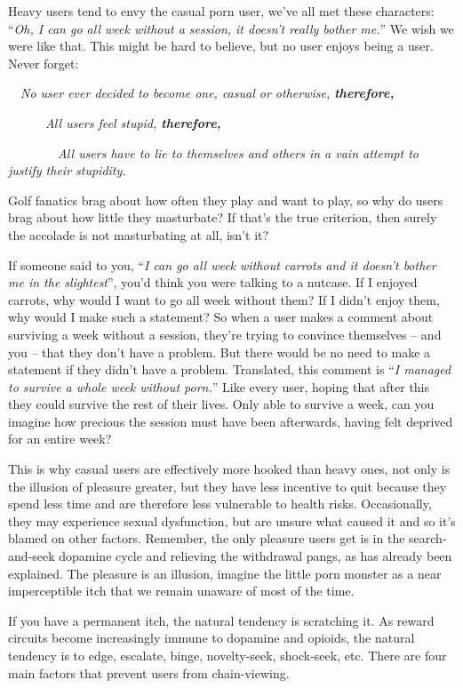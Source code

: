 \documentclass[
]{book}
\begin{document}
Heavy users tend to envy the casual porn user, we've all met these characters: ``\emph{Oh, I can go all week without a session, it doesn't really bother me.}'' We wish we were like that. This might be hard to believe, but no user enjoys being a user. Never forget:

~~\emph{No user ever decided to become one, casual or otherwise, \textbf{therefore,} }

~~~~~~\emph{All users feel stupid, \textbf{therefore,} }

~~~~~~~~\emph{All users have to lie to themselves and others in a vain attempt to justify their stupidity.}

Golf fanatics brag about how often they play and want to play, so why do users brag about how little they masturbate? If that's the true criterion, then surely the accolade is not masturbating at all, isn't it?

If someone said to you, ``\emph{I can go all week without carrots and it doesn't bother me in the slightest}'', you'd think you were talking to a nutcase. If I enjoyed carrots, why would I want to go all week without them? If I didn't enjoy them, why would I make such a statement? So when a user makes a comment about surviving a week without a session, they're trying to convince themselves -- and you -- that they don't have a problem. But there would be no need to make a statement if they didn't have a problem. Translated, this comment is ``\emph{I managed to survive a whole week without porn.}'' Like every user, hoping that after this they could survive the rest of their lives. Only able to survive a week, can you imagine how precious the session must have been afterwards, having felt deprived for an entire week?

This is why casual users are effectively more hooked than heavy ones, not only is the illusion of pleasure greater, but they have less incentive to quit because they spend less time and are therefore less vulnerable to health risks. Occasionally, they may experience sexual dysfunction, but are unsure what caused it and so it's blamed on other factors. Remember, the only pleasure users get is in the search-and-seek dopamine cycle and relieving the withdrawal pangs, as has already been explained. The pleasure is an illusion, imagine the little porn monster as a near imperceptible itch that we remain unaware of most of the time.

If you have a permanent itch, the natural tendency is scratching it. As reward circuits become increasingly immune to dopamine and opioids, the natural tendency is to edge, escalate, binge, novelty-seek, shock-seek, etc. There are four main factors that prevent users from chain-viewing.
\end{document}
